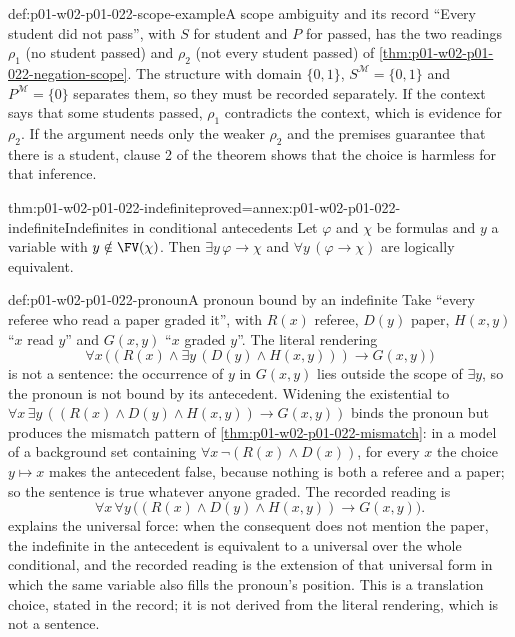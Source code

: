 \begin{hbexample}{def:p01-w02-p01-022-scope-example}{A scope ambiguity and its record}
``Every student did not pass'', with \(S\) for student and \(P\) for passed,
has the two readings \(\rho_1\) (no student passed) and \(\rho_2\) (not every
student passed) of \cref{thm:p01-w02-p01-022-negation-scope}. The structure
with domain \(\{0,1\}\), \(S^{\mathcal M}=\{0,1\}\) and
\(P^{\mathcal M}=\{0\}\) separates them, so they must be recorded
separately. If the context says that some students passed, \(\rho_1\)
contradicts the context, which is evidence for \(\rho_2\). If the argument
needs only the weaker \(\rho_2\) and the premises guarantee that there is a
student, clause 2 of the theorem shows that the choice is harmless for that
inference.
\end{hbexample}

\begin{hblemma}{thm:p01-w02-p01-022-indefinite}{proved=annex:p01-w02-p01-022-indefinite}{Indefinites in conditional antecedents}
Let \(\varphi\) and \(\chi\) be formulas and \(y\) a variable with
\(y\notin\FV(\chi)\). Then \(\exists y\,\varphi\to\chi\) and
\(\forall y\,(\varphi\to\chi)\) are logically equivalent.
\end{hblemma}

\begin{hbexample}{def:p01-w02-p01-022-pronoun}{A pronoun bound by an indefinite}
Take ``every referee who read a paper graded it'', with \(R(x)\) referee,
\(D(y)\) paper, \(H(x,y)\) ``\(x\) read \(y\)'' and \(G(x,y)\) ``\(x\) graded
\(y\)''. The literal rendering
\[
  \forall x\,\bigl((R(x)\land\exists y\,(D(y)\land H(x,y)))\to G(x,y)\bigr)
\]
is not a sentence: the occurrence of \(y\) in \(G(x,y)\) lies outside the
scope of \(\exists y\), so the pronoun is not bound by its antecedent.
Widening the existential to
\(\forall x\,\exists y\,((R(x)\land D(y)\land H(x,y))\to G(x,y))\) binds the
pronoun but produces the mismatch pattern of
\cref{thm:p01-w02-p01-022-mismatch}: in a model of a background set containing
\(\forall x\,\neg(R(x)\land D(x))\), for every \(x\) the choice
\(y\mapsto x\) makes the antecedent false, because nothing is both a
referee and a paper; so the sentence is true whatever anyone graded. The
recorded reading is
\[
  \forall x\,\forall y\,\bigl((R(x)\land D(y)\land H(x,y))\to G(x,y)\bigr).
\]
 explains the universal force: when the
consequent does not mention the paper, the indefinite in the antecedent is
equivalent to a universal over the whole conditional, and the recorded
reading is the extension of that universal form in which the same variable
also fills the pronoun's position. This is a translation choice, stated in
the record; it is not derived from the literal rendering, which is not a
sentence.
\end{hbexample}

